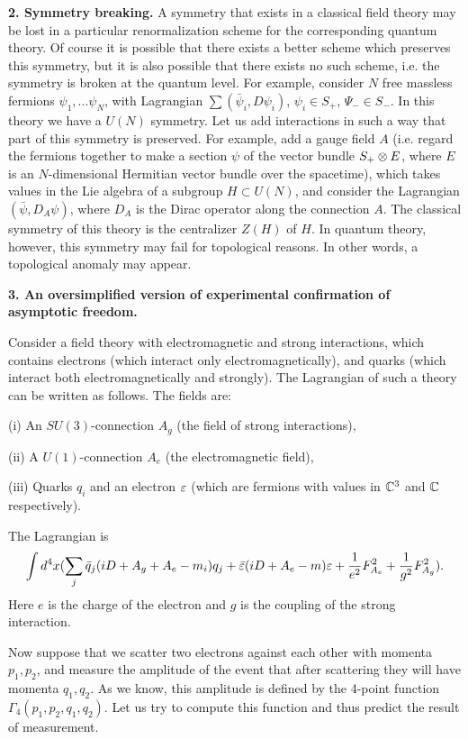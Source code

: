 \documentclass[11pt]{article}
\begin{document}
{\bf 2. Symmetry breaking.}
A symmetry that exists in a classical field theory may be lost in 
a particular renormalization
scheme for the corresponding quantum theory.
Of course it is possible that there exists a better scheme
which preserves this symmetry, but it is also possible 
that there exists no such scheme, i.e. the symmetry is
broken at the quantum level. For example, consider 
$N$ free massless fermions $\psi_1,...\psi_N$,
with Lagrangian
$\sum (\bar\psi_i,D\psi_i)$, 
$\psi_i\in S_+$, $\Psi_-\in S_-$. In this theory we have 
a $U(N)$ symmetry. Let us add interactions in such a way 
that part of this symmetry is preserved. For example, add a gauge 
field $A$ (i.e. regard the fermions together to make 
a section $\psi$ of the vector bundle $S_+\otimes E$, 
where $E$ is an $N$-dimensional
Hermitian vector bundle over the spacetime), 
which takes values in the Lie algebra of a subgroup 
$H\subset U(N)$, and consider 
the Lagrangian $(\bar\psi,D_A\psi)$, where $D_A$ is the Dirac 
operator along the connection $A$. 
The classical 
symmetry of this theory is the centralizer $Z(H)$ of $H$. 
In quantum theory, however, this symmetry may fail for topological 
reasons. In other words, a topological anomaly may appear.

{\bf 3. An oversimplified version of experimental confirmation 
of asymptotic freedom.}

Consider a field theory with electromagnetic and strong interactions, 
which contains electrons (which interact only electromagnetically),
and quarks (which interact both electromagnetically and strongly). 
The Lagrangian of such a theory can be written as follows. 
The fields are:


(i) An $SU(3)$-connection $A_g$ (the field of strong interactions),

(ii) A $U(1)$-connection $A_e$ (the electromagnetic field),
 
(iii) Quarks $q_i$ and an electron $\varepsilon$ (which are fermions
with values in $\Bbb C^3$ and $\Bbb C$ respectively).

The Lagrangian is
$$
\int d^4x(\sum_j \bar q_j(iD+A_g+A_e-m_i)q_j+
\bar{\varepsilon}(iD+A_e-m)\varepsilon+\frac{1}{e^2}F_{A_e}^2+\frac{1}{g^2}F_{A_g}^2).
$$
Here $e$ is the charge of the electron and $g$ is the
coupling of the strong interaction. 

Now suppose that we scatter two electrons against each other 
with momenta $p_1,p_2$, and measure the amplitude of the event that
after scattering they will have momenta $q_1,q_2$. 
As we know, this amplitude is defined by the 4-point function 
$\Gamma_4(p_1,p_2,q_1,q_2)$. Let us try to compute this function and thus 
predict the result of measurement. 
 
\end{document}

